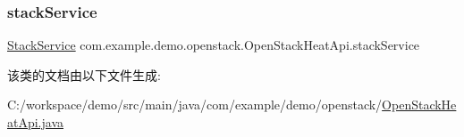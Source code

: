 \subsubsection{\texorpdfstring{stack\+Service}{stackService}}
{\footnotesize\ttfamily \mbox{\hyperlink{classcom_1_1example_1_1demo_1_1service_1_1_stack_service}{Stack\+Service}} com.\+example.\+demo.\+openstack.\+Open\+Stack\+Heat\+Api.\+stack\+Service\hspace{0.3cm}{\ttfamily [private]}}



该类的文档由以下文件生成\+:\begin{DoxyCompactItemize}
\item 
C\+:/workspace/demo/src/main/java/com/example/demo/openstack/\mbox{\hyperlink{_open_stack_heat_api_8java}{Open\+Stack\+Heat\+Api.\+java}}\end{DoxyCompactItemize}
